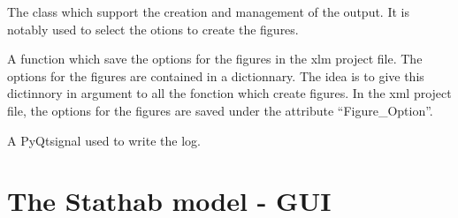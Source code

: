 \documentclass[letterpaper,10pt,english]{sphinxmanual}
\begin{document}
\begin{fulllineitems}
\label{\detokenize{index:src_GUI.output_fig_GUI.outputW}}
The class which support the creation and management of the output. It is notably used to select the otions to
create the figures.

\begin{fulllineitems}
\label{\detokenize{index:src_GUI.output_fig_GUI.outputW.init_iu}}
\end{fulllineitems}


\begin{fulllineitems}
\label{\detokenize{index:src_GUI.output_fig_GUI.outputW.save_option_fig}}
A function which save the options for the figures in the xlm project file. The options for the figures are
contained in a dictionnary. The idea is to give this dictinnory in argument to all the fonction which create
figures. In the xml project file, the options for the figures are saved under the attribute ``Figure\_Option''.

\end{fulllineitems}


\begin{fulllineitems}
\label{\detokenize{index:src_GUI.output_fig_GUI.outputW.send_log}}
A PyQtsignal used to write the log.

\end{fulllineitems}


\end{fulllineitems}



\section{The Stathab model - GUI}
\label{\detokenize{index:the-stathab-model-gui}}\label{\detokenize{index:module-src_GUI.stathab_GUI}}
\end{document}
